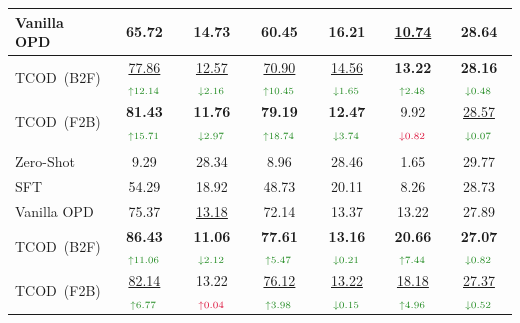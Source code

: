 \documentclass{article} %
\newcommand{\ours}{TCOD\xspace}
\begin{document}
\begin{table}[t]
{\begin{tabular}{lcccccc}
\quad Vanilla OPD
    & 65.72             & 14.73
    & 60.45             & 16.21
    & \underline{10.74} & 28.64 \\
    \midrule
\rowcolor{ourscolor}
\quad \ours~(B2F)
    & \underline{77.86}$_{\color{mygreen}\uparrow 12.14}$
    & \underline{12.57}$_{\color{mygreen}\downarrow 2.16}$
    & \underline{70.90}$_{\color{mygreen}\uparrow 10.45}$
    & \underline{14.56}$_{\color{mygreen}\downarrow 1.65}$
    & \textbf{13.22}$_{\color{mygreen}\uparrow 2.48}$
    & \textbf{28.16}$_{\color{mygreen}\downarrow 0.48}$ \\
\rowcolor{ourscolor}
\quad \ours~(F2B)
    & \textbf{81.43}$_{\color{mygreen}\uparrow 15.71}$
    & \textbf{11.76}$_{\color{mygreen}\downarrow 2.97}$
    & \textbf{79.19}$_{\color{mygreen}\uparrow 18.74}$
    & \textbf{12.47}$_{\color{mygreen}\downarrow 3.74}$
    & 9.92$_{\color{myred}\downarrow 0.82}$
    & \underline{28.57}$_{\color{mygreen}\downarrow 0.07}$ \\
\midrule
\rowcolor{groupcolor}
\multicolumn{7}{c}{\textit{Qwen2.5-7B}~{\small\textcolor{gray}{(Student)}}} \\
\quad Zero-Shot
    & 9.29  & 28.34
    & 8.96  & 28.46
    & 1.65  & 29.77 \\
\quad SFT
    & 54.29 & 18.92
    & 48.73 & 20.11
    & 8.26  & 28.73 \\
\quad Vanilla OPD
    & 75.37             & \underline{13.18}
    & 72.14             & 13.37
    & 13.22             & 27.89 \\
 
\midrule
\rowcolor{ourscolor}
\quad \ours~(B2F)
    & \textbf{86.43}$_{\color{mygreen}\uparrow 11.06}$
    & \textbf{11.06}$_{\color{mygreen}\downarrow 2.12}$
    & \textbf{77.61}$_{\color{mygreen}\uparrow 5.47}$
    & \textbf{13.16}$_{\color{mygreen}\downarrow 0.21}$
    & \textbf{20.66}$_{\color{mygreen}\uparrow 7.44}$
    & \textbf{27.07}$_{\color{mygreen}\downarrow 0.82}$ \\
\rowcolor{ourscolor}
\quad \ours~(F2B)
    & \underline{82.14}$_{\color{mygreen}\uparrow 6.77}$
    & 13.22$_{\color{myred}\uparrow 0.04}$
    & \underline{76.12}$_{\color{mygreen}\uparrow 3.98}$
    & \underline{13.22}$_{\color{mygreen}\downarrow 0.15}$
    & \underline{18.18}$_{\color{mygreen}\uparrow 4.96}$
    & \underline{27.37}$_{\color{mygreen}\downarrow 0.52}$ \\
\bottomrule
\end{tabular}
}
\end{table}
\end{document}
